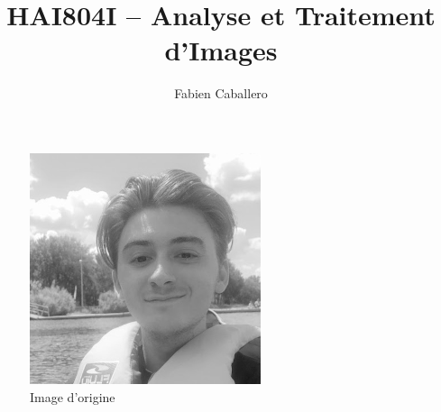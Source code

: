 \documentclass{article}
\title{HAI804I – Analyse et Traitement d'Images}
\author{Fabien Caballero }
\begin{document}
  

\maketitle
    \tableofcontents

\newpage

\begin{figure}[h!]
\centerline{\includegraphics[scale=1.]{./rendus/MOIMOIETMOI.png}}
\caption{Image d'origine}
\end{figure}

\newpage
\end{document}
